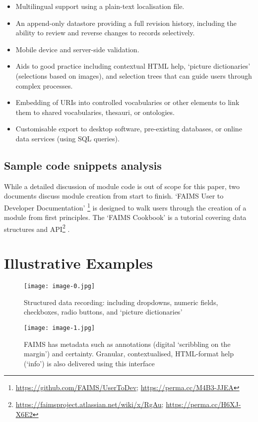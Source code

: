 \documentclass[preprint,12pt, a4paper]{elsarticle}
\begin{document}
\begin{itemize}
\item Multilingual support using a plain-text localisation file.
\item An append-only datastore providing a full revision history, including the ability to review and reverse changes to records selectively.
\item Mobile device and server-side validation.
\item Aids to good practice including contextual HTML help, `picture dictionaries' (selections based on images), and selection trees that can guide users through complex processes.
\item Embedding of URIs into controlled vocabularies or other elements to link them to shared vocabularies, thesauri, or ontologies.
\item Customisable export to desktop software, pre-existing databases, or online data services (using SQL queries).
\end{itemize}


\subsection{Sample code snippets analysis}


While a detailed discussion of module code is out of scope for this paper, two documents discuss module creation from start to finish. `FAIMS User to Developer Documentation' \footnote{\url{https://github.com/FAIMS/UserToDev}; \url{https://perma.cc/M4B3-JJEA}} is designed to walk users through the creation of a module from first principles. The `FAIMS Cookbook' is a tutorial covering data structures and API\footnote{\url{https://faimsproject.atlassian.net/wiki/x/RgAu}; \url{https://perma.cc/H6XJ-X6E2}} .

\section{Illustrative Examples}


\begin{figure}[!htb]
	\texttt{[image: image-0.jpg]}
	\caption{Structured data recording: including dropdowns, numeric fields, checkboxes, radio buttons, and `picture dictionaries'}
	\label{fig:img0}
\endminipage\hfill
{}
	\texttt{[image: image-1.jpg]}
	\caption{FAIMS has metadata such as annotations (digital `scribbling on the margin') and certainty. Granular, contextualised, HTML-format help (`info') is also delivered using this interface}
	\label{fig:img1}
\endminipage\hfill

\end{figure}
\end{document}
